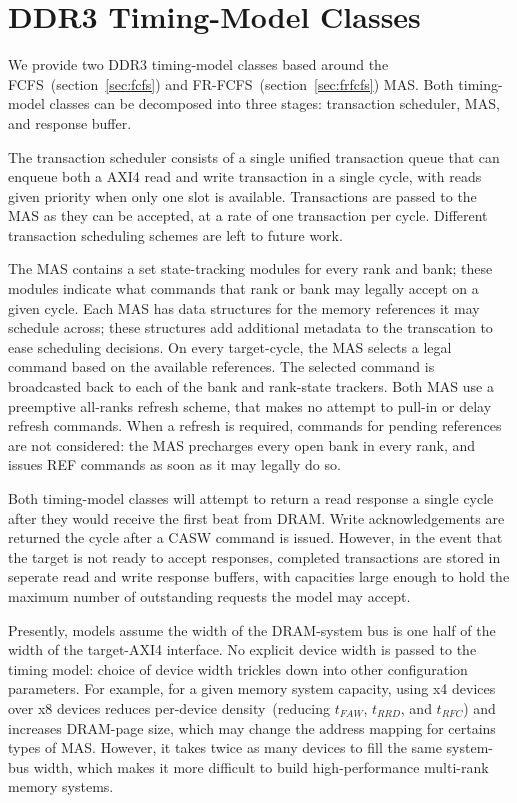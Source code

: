 \clearpage
\section{DDR3 Timing-Model Classes}

We provide two DDR3 timing-model classes based around the
FCFS~(section~\ref{sec:fcfs}) and FR-FCFS~(section~\ref{sec:frfcfs}) MAS. Both
timing-model classes can be decomposed into three stages: transaction
scheduler, MAS, and response buffer.

The transaction scheduler consists of a single unified transaction queue that
can enqueue both a AXI4 read and write transaction in a single cycle, with reads
given priority when only one slot is available. Transactions are passed to the
MAS as they can be accepted, at a rate of one transaction per cycle.  Different
transaction scheduling schemes are left to future work.

The MAS contains a set state-tracking modules for every rank and bank; these
modules indicate what commands that rank or bank may legally accept on a given
cycle. Each MAS has data structures for the memory references it may schedule
across; these structures add additional metadata to the transcation to ease
scheduling decisions. On every target-cycle, the MAS selects a legal command
based on the available references. The selected command is broadcasted back to
each of the bank and rank-state trackers.  Both MAS use a preemptive all-ranks
refresh scheme, that makes no attempt to pull-in or delay refresh commands.
When a refresh is required, commands for pending references are not considered:
the MAS precharges every open bank in every rank, and issues REF commands as
soon as it may legally do so.

Both timing-model classes will attempt to return a read response a single cycle
after they would receive the first beat from DRAM. Write acknowledgements are
returned the cycle after a CASW command is issued. However, in the event that
the target is not ready to accept responses, completed transactions are stored
in seperate read and write response buffers, with capacities large enough to
hold the maximum number of outstanding requests the model may accept.

Presently, models assume the width of the DRAM-system bus is one half of the width of the
target-AXI4 interface. No explicit device width is passed to the timing
model: choice of device width trickles down into other configuration
parameters. For example, for a given memory system capacity, using x4 devices
over x8 devices reduces per-device density~(reducing $t_{FAW}$,
$t_{RRD}$, and $t_{RFC}$) and increases DRAM-page size, which may change the
address mapping for certains types of MAS.  However, it takes twice as many
devices to fill the same system-bus width, which makes it more difficult to
build high-performance multi-rank memory systems.

